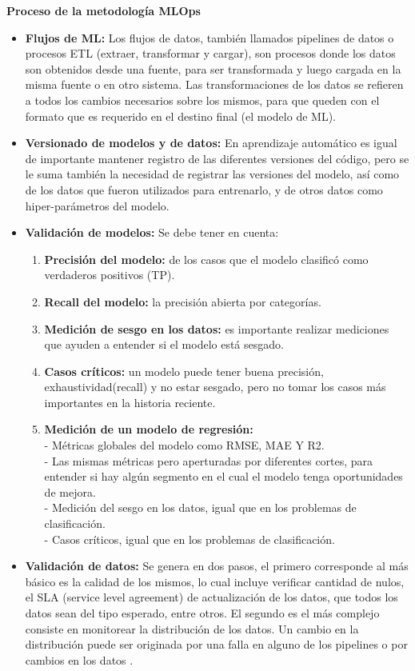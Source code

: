 \textbf{Proceso de la metodología MLOps}
\begin{itemize}
\item \textbf{Flujos de ML:} Los flujos de datos, también llamados pipelines de datos o procesos ETL (extraer, transformar y cargar), son procesos donde los datos son obtenidos desde una fuente, para ser transformada y luego cargada en la misma fuente o en otro sistema. Las transformaciones de los datos se refieren a todos los cambios necesarios sobre los mismos, para que queden con el formato que es requerido en el destino final (el modelo de ML).
\item \textbf{Versionado de modelos y de datos:} En aprendizaje automático es igual de importante mantener registro de las diferentes versiones del código, pero se le suma también la necesidad de registrar las versiones del modelo, así como de los datos que fueron utilizados para entrenarlo, y de otros datos como hiper-parámetros del modelo.
\item \textbf{Validación de modelos:} Se debe tener en cuenta:
    \begin{enumerate}
        \item \textbf{Precisión del modelo:} de los casos que el modelo clasificó como verdaderos positivos (TP).
        \item \textbf{Recall del modelo:} la precisión abierta por categorías.
        \item \textbf{Medición de sesgo en los datos:} es importante realizar mediciones que ayuden a entender si el modelo está sesgado.
        \item \textbf{Casos críticos:} un modelo puede tener buena precisión, exhaustividad(recall) y no estar sesgado, pero no tomar los casos más importantes en la historia reciente.
        \item \textbf{Medición de un modelo de regresión:}\\
- Métricas globales del modelo como RMSE, MAE Y R2.\\
- Las mismas métricas pero aperturadas por diferentes cortes, para entender si hay algún segmento en el cual el modelo tenga oportunidades de mejora.\\
- Medición del sesgo en los datos, igual que en los problemas de clasificación.\\
- Casos críticos, igual que en los problemas de clasificación.
    \end{enumerate}
\item \textbf{Validación de datos:} Se genera en dos pasos, el primero corresponde al más básico es la calidad de los mismos, lo cual incluye verificar cantidad de nulos, el SLA (service level agreement) de actualización de los datos, que todos los datos sean del tipo esperado, entre otros. El segundo es el más complejo consiste en monitorear la distribución de los datos. Un cambio en la distribución puede ser originada por una falla en alguno de los pipelines o por cambios en los datos \citep{rivero2022}. 
\end{itemize}

